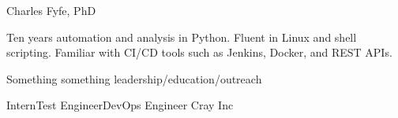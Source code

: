 \documentclass[12pt,letterpaper]{article}
\begin{document}
\begin{center}
    {\huge Charles Fyfe, PhD}

    \vspace{8pt}

    \emailtag\hfill\webtag\hfill\phonetag\hfill\citytag
\end{center}

\Break

Ten years automation and analysis in Python.
Fluent in Linux and shell scripting.
Familiar with CI/CD tools such as Jenkins, Docker, and REST APIs.

Something something leadership/education/outreach

\Break

\headerrow
    {Intern{\then}Test Engineer{\then}DevOps Engineer}
    {Cray Inc}
    {}
\end{document}
